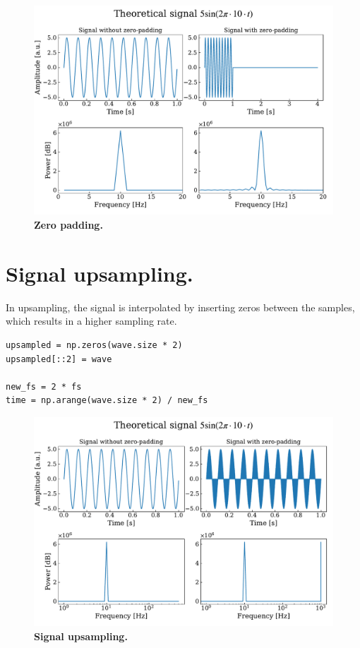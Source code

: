 \documentclass[13pt,a4paper]{article}
\begin{document}
\begin{figure}[ht!]
    \centering
    \includegraphics[width=\linewidth]{zero_pad.pdf}
    \caption{\textbf{Zero padding.}}
    \label{fig:zero_padding}
\end{figure}
\pagebreak


\section{Signal upsampling.}

In upsampling, the signal is interpolated by inserting zeros between the samples, which results in a higher sampling rate.

\begin{lstlisting}[caption={\textbf{Code snippet for upsampling the signal.}}]
upsampled = np.zeros(wave.size * 2)
upsampled[::2] = wave

new_fs = 2 * fs
time = np.arange(wave.size * 2) / new_fs
\end{lstlisting}

\begin{figure}[ht!]
    \centering
    \includegraphics[width=\linewidth]{upsampling.pdf}
    \caption{\textbf{Signal upsampling.}}
    \label{fig:upsampling}
\end{figure}
\end{document}
